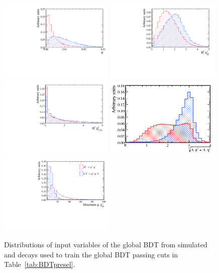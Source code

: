 \begin{figure}[htbp]
    \centering
        \includegraphics[width=0.49\textwidth]{./Figs/Selection/Arcos_Mar.pdf}
       \includegraphics[width=0.49\textwidth]{./Figs/Selection/B_IPS_Mar.pdf}
 \includegraphics[width=0.49\textwidth]{./Figs/Selection/Vertex_Mar.pdf}
 \includegraphics[width=0.49\textwidth]{./Figs/Selection/srqt_Mar.png}
 \includegraphics[width=0.49\textwidth]{./Figs/Selection/Min_IP_Mar.pdf}

    \caption{Distributions of input variables of the global BDT from simulated \bsmumu and \bbbarmumux decays used to train the global BDT passing cuts in Table~\ref{tab:BDTpresel}.}
    \label{fig:BDTvars}
\end{figure}


